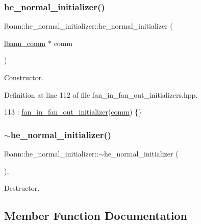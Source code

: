 \subsubsection{\texorpdfstring{he\+\_\+normal\+\_\+initializer()}{he\_normal\_initializer()}}
{\footnotesize\ttfamily lbann\+::he\+\_\+normal\+\_\+initializer\+::he\+\_\+normal\+\_\+initializer (\begin{DoxyParamCaption}\item[{\hyperlink{classlbann_1_1lbann__comm}{lbann\+\_\+comm} $\ast$}]{comm }\end{DoxyParamCaption})\hspace{0.3cm}{\ttfamily [inline]}}

Constructor. 

Definition at line 112 of file fan\+\_\+in\+\_\+fan\+\_\+out\+\_\+initializers.\+hpp.


\begin{DoxyCode}
113     : \hyperlink{classlbann_1_1fan__in__fan__out__initializer_a3a3811af11b1a70a57af846ae2cdf668}{fan\_in\_fan\_out\_initializer}(\hyperlink{file__io_8cpp_ab048c6f9fcbcfaa57ce68b00263dbebe}{comm}) \{\}
\end{DoxyCode}
\mbox{\label{classlbann_1_1he__normal__initializer_ad883d984ad8dfd44c8ed8d28f5a9697d}} 
\subsubsection{\texorpdfstring{$\sim$he\+\_\+normal\+\_\+initializer()}{~he\_normal\_initializer()}}
{\footnotesize\ttfamily lbann\+::he\+\_\+normal\+\_\+initializer\+::$\sim$he\+\_\+normal\+\_\+initializer (\begin{DoxyParamCaption}{ }\end{DoxyParamCaption})\hspace{0.3cm}{\ttfamily [override]}, {\ttfamily [default]}}

Destructor. 

\subsection{Member Function Documentation}
\mbox{\label{classlbann_1_1he__normal__initializer_af71916bbf87c6d34fb701c79fa6237bf}} 
